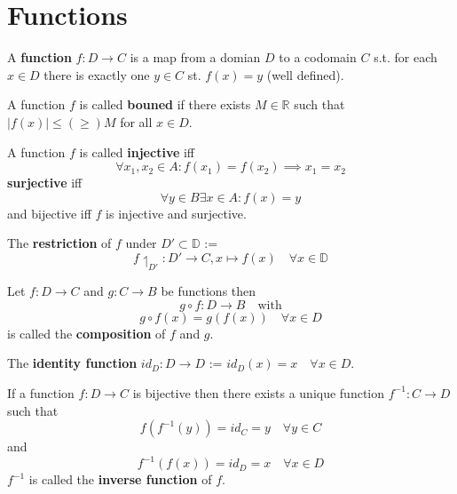\section{Functions}

\begin{definition}
    A \textbf{function} $f: D \to C$ is a map from a domian $D$ to a codomain $C$ s.t. for each $x \in D$ there is exactly one $y \in C$ st. $f(x) = y$ (well defined).
\end{definition}

\begin{definition}
    A function $f$ is called \textbf{bouned} if there exists $M \in \mathbb{R}$ such that $|f(x)| \leq(\geq) M$ for all $x \in D$.
\end{definition}

\begin{definition}
    A function $f$ is called \textbf{injective} iff 
    $$\forall x_1, x_2 \in A : f(x_1) = f(x_2) \implies x_1 = x_2$$
    \textbf{surjective} iff 
    $$\forall y \in B \exists x \in A : f(x) = y$$
    and bijective iff $f$ is injective and surjective.
\end{definition}

\begin{definition}
    The \textbf{restriction} of $f$ under $D' \subset \mathbb{D}$ := 
    $$f\upharpoonleft_{D'}: D' \to C, x \mapsto f(x) \quad \forall x \in \mathbb{D}$$
\end{definition}

\begin{definition}
    Let $f: D \to C$ and $g: C \to B$ be functions then
    $$g \circ f: D \to B \quad \text{with}$$
    $$g \circ f(x) = g(f(x)) \quad \forall x \in D$$
    is called the \textbf{composition} of $f$ and $g$.
\end{definition}

\begin{definition}
    The \textbf{identity function} $id_D: D \to D$ := $id_D(x) = x \quad \forall x \in D$.
\end{definition}

\begin{definition}
    If a function $f: D \to C$ is bijective then there exists a unique function $f^{-1}: C \to D$ such that
    $$ f(f^{-1}(y)) = id_C = y \quad \forall y \in C$$
    and
    $$ f^{-1}(f(x)) = id_D = x \quad \forall x \in D$$
    $f^{-1}$ is called the \textbf{inverse function} of $f$.
\end{definition}

